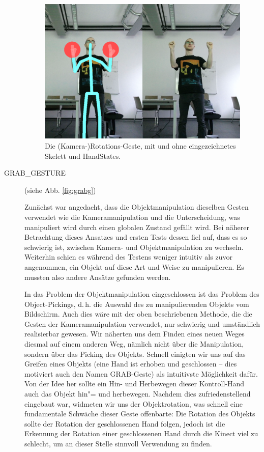 \begin{description}
		\begin{figure}[h!]
		\centering
		\includegraphics[width=.8\textwidth]{pictures/rotate_.png}
		\caption{Die (Kamera-)Rotations-Geste, mit und ohne eingezeichnetes Skelett und HandStates.}\label{fig:rotateg}
		\end{figure}		
		\par
		\item[GRAB\_GESTURE] (siehe Abb. \ref{fig:grabg})\par
		Zunächst war angedacht, dass die Objektmanipulation dieselben Gesten verwendet wie die Kameramanipulation und die Unterscheidung, was manipuliert wird durch einen globalen Zustand gefällt wird. Bei näherer Betrachtung dieses Ansatzes und ersten Tests dessen fiel auf, dass es so schwierig ist, zwischen Kamera- und Objektmanipulation zu wechseln. Weiterhin schien es während des Testens weniger intuitiv als zuvor angenommen, ein Objekt auf diese Art und Weise zu manipulieren. Es mussten also andere Ansätze gefunden werden.\par 
		In das Problem der Objektmanipulation eingeschlossen ist das Problem des Object-Pickings, d.\,h. die Auswahl des zu manipulierenden Objekts vom Bildschirm. Auch dies wäre mit der oben beschriebenen Methode, die die Gesten der Kameramanipulation verwendet, nur schwierig und umständlich realisierbar gewesen. Wir näherten uns dem Finden eines neuen Weges diesmal auf einem anderen Weg, nämlich nicht über die Manipulation, sondern über das Picking des Objekts. Schnell einigten wir uns auf das Greifen eines Objekts (eine Hand ist erhoben und geschlossen -- dies motiviert auch den Namen \glqq GRAB\grqq-Geste) als intuitivste Möglichkeit dafür. Von der Idee her sollte ein Hin- und Herbewegen dieser \glqq Kontroll-Hand\grqq{} auch das Objekt hin"= und herbewegen. Nachdem dies zufriedenstellend eingebaut war, widmeten wir uns der Objektrotation, was schnell eine fundamentale Schwäche dieser Geste offenbarte: Die Rotation des Objekts sollte der Rotation der geschlossenen Hand folgen, jedoch ist die Erkennung der Rotation einer geschlossenen Hand durch die Kinect viel zu schlecht, um an dieser Stelle sinnvoll Verwendung zu finden.\par 

\end{description}

